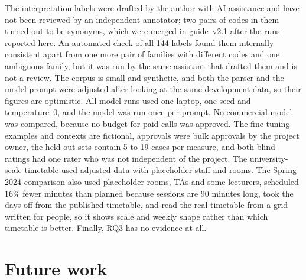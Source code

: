 The interpretation labels were drafted by the author with AI assistance and have not been reviewed by an independent annotator; two pairs of codes in them turned out to be synonyms, which were merged in guide~v2.1 after the runs reported here. An automated check of all 144 labels found them internally consistent apart from one more pair of families with different codes and one ambiguous family, but it was run by the same assistant that drafted them and is not a review. The corpus is small and synthetic, and both the parser and the model prompt were adjusted after looking at the same development data, so their figures are optimistic. All model runs used one laptop, one seed and temperature~0, and the model was run once per prompt. No commercial model was compared, because no budget for paid calls was approved. The fine-tuning examples and contexts are fictional, approvals were bulk approvals by the project owner, the held-out sets contain 5 to 19 cases per measure, and both blind ratings had one rater who was not independent of the project. The university-scale timetable used adjusted data with placeholder staff and rooms. The Spring 2024 comparison also used placeholder rooms, TAs and some lecturers, scheduled 16\% fewer minutes than planned because sessions are 90 minutes long, took the days off from the published timetable, and read the real timetable from a grid written for people, so it shows scale and weekly shape rather than which timetable is better. Finally, RQ3 has no evidence at all.

\section{Future work}

